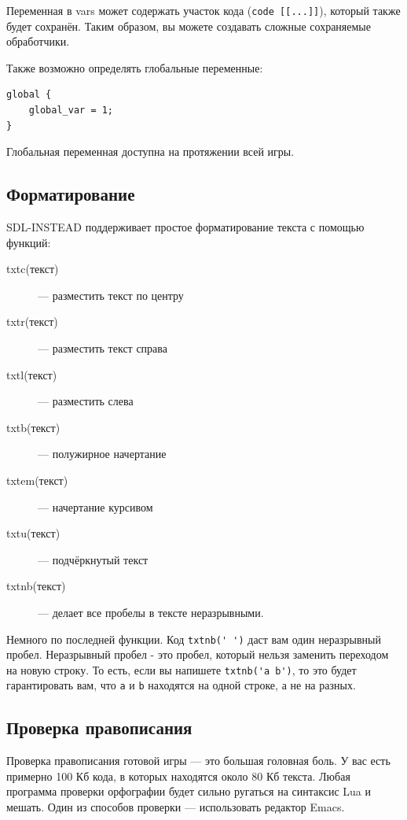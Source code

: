 \documentclass[a4paper,12pt]{article}
\begin{document}
Переменная в vars может содержать участок кода (\verb/code [[...]]/), который также будет сохранён. Таким образом, вы можете создавать сложные сохраняемые обработчики.

Также возможно определять глобальные переменные:
\begin{verbatim}
global {
    global_var = 1;    
}
\end{verbatim}
Глобальная переменная доступна на протяжении всей игры.

\subsection{Форматирование}
SDL-INSTEAD поддерживает простое форматирование текста с помощью функций:

\begin{description}
\item[txtc(текст)]  --- разместить текст по центру
\item[txtr(текст)]  --- разместить текст справа
\item[txtl(текст)]  --- разместить слева
\item[txtb(текст)]  --- полужирное начертание
\item[txtem(текст)]  --- начертание курсивом
\item[txtu(текст)]  --- подчёркнутый текст
\item[txtnb(текст)]  --- делает все пробелы в тексте неразрывными.
\end{description}

Немного по последней функции. Код \verb/txtnb(' ')/ даст вам один неразрывный пробел. Неразрывный пробел - это пробел, который нельзя заменить переходом на новую строку. То есть, если вы напишете \verb/txtnb('a b')/, то это будет гарантировать вам, что \verb/a/ и \verb/b/ находятся на одной строке, а не на разных.

\subsection{Проверка правописания}
Проверка правописания готовой игры --- это большая головная боль. У вас есть примерно 100 Кб кода, в которых находятся около 80 Кб текста. Любая программа проверки орфографии будет сильно ругаться на синтаксис Lua и мешать. Один из способов проверки --- использовать редактор Emacs.
\end{document}
